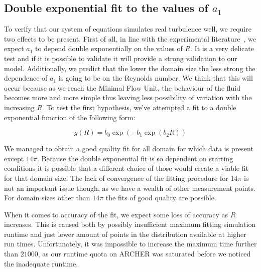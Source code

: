 \documentclass[11pt,a4paper]{article}
\begin{document}
\subsection{Double exponential fit to the values of $a_1$}
To verify that our system of equations simulates real turbulence well, we require two effects to be present.
First of all, in line with the experimental literature~\cite{Hof06}, we expect $a_1$ to depend double exponentially on the values of $R$.
It is a very delicate test and if it is possible to validate it will provide a strong validation to our model.
Additionally, we predict that the lower the domain size the less strong the dependence of $a_1$ is going to be on the Reynolds number.
We think that this will occur because as we reach the Minimal Flow Unit, the behaviour of the fluid becomes more and more simple thus leaving less possibility of variation with the increasing $R$.
To test the first hypothesis, we've attempted a fit to a double exponential function of the following form:

\begin{equation}\label{eq:g}
 g(R) = b_0\exp(-b_1\exp(b_2R))
 \end{equation}

We managed to obtain a good quality fit for all domain for which data is present except $14\pi$.
Because the double exponential fit is so dependent on starting conditions it is possible that a different choice of those would create a viable fit for that domain size.
The lack of convergence of the fitting procedure for $14\pi$ is not an important issue though, as we have a wealth of other measurement points.
For domain sizes other than $14\pi$ the fits of good quality are possible.

When it comes to accuracy of the fit, we expect some loss of accuracy as $R$ increases.
This is caused both by possibly insufficient maximum fitting simulation runtime and just lower amount of points in the distribution available at higher run times.
Unfortunately, it was impossible to increase the maximum time further than $21000$, as our runtime quota on ARCHER was saturated before we noticed the inadequate runtime.
\end{document}
